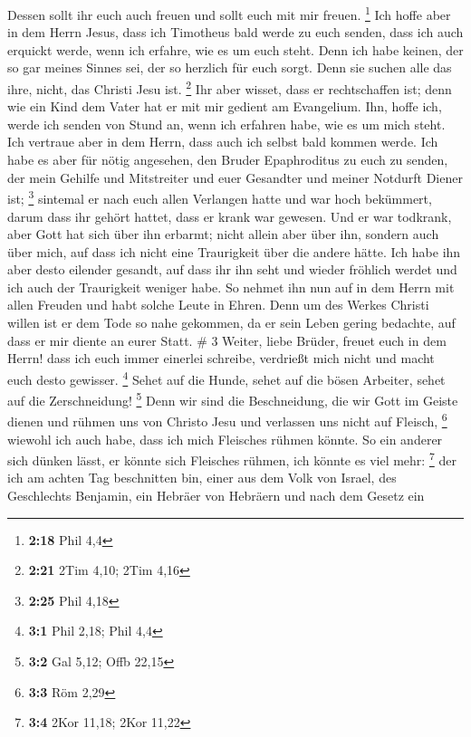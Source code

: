 Dessen sollt ihr euch auch freuen und sollt euch mit mir freuen.
\footnote{\textbf{2:18} Phil 4,4}  Ich hoffe aber in dem
Herrn Jesus, dass ich Timotheus bald werde zu euch senden, dass ich auch
erquickt werde, wenn ich erfahre, wie es um euch steht. 
Denn ich habe keinen, der so gar meines Sinnes sei, der so herzlich für
euch sorgt.  Denn sie suchen alle das ihre, nicht, das
Christi Jesu ist. \footnote{\textbf{2:21} 2Tim 4,10; 2Tim 4,16}
 Ihr aber wisset, dass er rechtschaffen ist; denn wie ein
Kind dem Vater hat er mit mir gedient am Evangelium. 
Ihn, hoffe ich, werde ich senden von Stund an, wenn ich erfahren habe,
wie es um mich steht.  Ich vertraue aber in dem Herrn,
dass auch ich selbst bald kommen werde.  Ich habe es aber
für nötig angesehen, den Bruder Epaphroditus zu euch zu senden, der mein
Gehilfe und Mitstreiter und euer Gesandter und meiner Notdurft Diener
ist; \footnote{\textbf{2:25} Phil 4,18}  sintemal er nach
euch allen Verlangen hatte und war hoch bekümmert, darum dass ihr gehört
hattet, dass er krank war gewesen.  Und er war todkrank,
aber Gott hat sich über ihn erbarmt; nicht allein aber über ihn, sondern
auch über mich, auf dass ich nicht eine Traurigkeit über die andere
hätte.  Ich habe ihn aber desto eilender gesandt, auf
dass ihr ihn seht und wieder fröhlich werdet und ich auch der
Traurigkeit weniger habe.  So nehmet ihn nun auf in dem
Herrn mit allen Freuden und habt solche Leute in Ehren. 
Denn um des Werkes Christi willen ist er dem Tode so nahe gekommen, da
er sein Leben gering bedachte, auf dass er mir diente an eurer Statt. \#
3  Weiter, liebe Brüder, freuet euch in dem Herrn! dass
ich euch immer einerlei schreibe, verdrießt mich nicht und macht euch
desto gewisser. \footnote{\textbf{3:1} Phil 2,18; Phil 4,4}
 Sehet auf die Hunde, sehet auf die bösen Arbeiter, sehet
auf die Zerschneidung! \footnote{\textbf{3:2} Gal 5,12; Offb 22,15}
 Denn wir sind die Beschneidung, die wir Gott im Geiste
dienen und rühmen uns von Christo Jesu und verlassen uns nicht auf
Fleisch, \footnote{\textbf{3:3} Röm 2,29}  wiewohl ich
auch habe, dass ich mich Fleisches rühmen könnte. So ein anderer sich
dünken lässt, er könnte sich Fleisches rühmen, ich könnte es viel mehr:
\footnote{\textbf{3:4} 2Kor 11,18; 2Kor 11,22}  der ich am
achten Tag beschnitten bin, einer aus dem Volk von Israel, des
Geschlechts Benjamin, ein Hebräer von Hebräern und nach dem Gesetz ein
